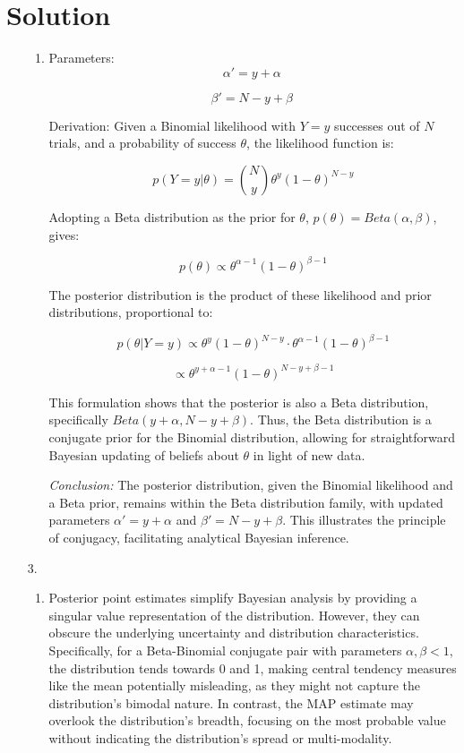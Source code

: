 \documentclass[submit]{harvardml}
\newenvironment{answer}
  {\section*{Solution}}
{}
\begin{document}
\begin{answer}
\begin{enumerate}
\begin{enumerate}
        \item

              Parameters:
              \[
                \alpha' = y + \alpha\
              \]

              \[
                \beta' = N - y + \beta\
              \]

              Derivation: 
Given a Binomial likelihood with \(Y = y\) successes out of \(N\) trials, and a probability of success \(\theta\), the likelihood function is:

\[ p(Y = y | \theta) = \binom{N}{y} \theta^y (1 - \theta)^{N-y} \]

Adopting a Beta distribution as the prior for \(\theta\), \( p(\theta) = Beta(\alpha, \beta) \), gives:

\[ p(\theta) \propto \theta^{\alpha-1} (1 - \theta)^{\beta-1} \]

The posterior distribution is the product of these likelihood and prior distributions, proportional to:

\[ p(\theta | Y = y) \propto \theta^y (1 - \theta)^{N-y} \cdot \theta^{\alpha-1} (1 - \theta)^{\beta-1} \]

\[ \propto \theta^{y+\alpha-1} (1 - \theta)^{N-y+\beta-1} \]

This formulation shows that the posterior is also a Beta distribution, specifically \(Beta(y + \alpha, N - y + \beta)\). Thus, the Beta distribution is a conjugate prior for the Binomial distribution, allowing for straightforward Bayesian updating of beliefs about \(\theta\) in light of new data.

\textit{Conclusion:} The posterior distribution, given the Binomial likelihood and a Beta prior, remains within the Beta distribution family, with updated parameters \(\alpha' = y + \alpha\) and \(\beta' = N - y + \beta\). This illustrates the principle of conjugacy, facilitating analytical Bayesian inference.


      \end{enumerate}

    \item[3.]

      \begin{enumerate}
        \item Posterior point estimates simplify Bayesian analysis by providing a singular value representation of the distribution. However, they can obscure the underlying uncertainty and distribution characteristics. Specifically, for a Beta-Binomial conjugate pair with parameters \(\alpha, \beta < 1\), the distribution tends towards 0 and 1, making central tendency measures like the mean potentially misleading, as they might not capture the distribution's bimodal nature. In contrast, the MAP estimate may overlook the distribution's breadth, focusing on the most probable value without indicating the distribution's spread or multi-modality.


\end{enumerate}
\end{enumerate}
\end{answer}
\end{document}
